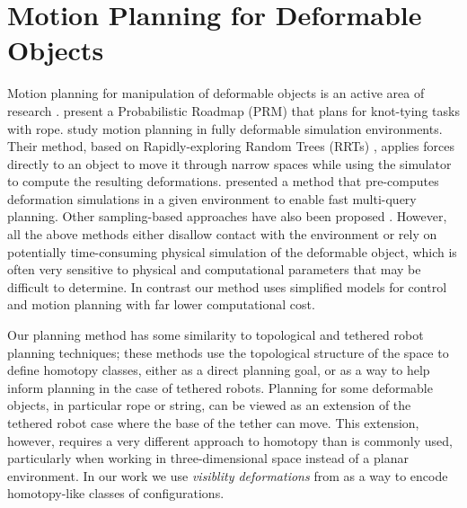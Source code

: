 
\section{Motion Planning for Deformable Objects}

Motion planning for manipulation of deformable objects is an active area of research \cite{Jimenez2012}. \citet{Saha2008} present a Probabilistic Roadmap (PRM) \cite{Kavraki1996} that plans for knot-tying tasks with rope. \citet{Rodriguez2006} study motion planning in fully deformable simulation environments. Their method, based on Rapidly-exploring Random Trees (RRTs) \cite{LaValle2006}, applies forces directly to an object to move it through narrow spaces while using the simulator to compute the resulting deformations. \citet{Frank2011} presented a method that pre-computes deformation simulations in a given environment to enable fast multi-query planning. Other sampling-based approaches have also been proposed \cite{Anshelevich2000a, Lamiraux2001, BurchanBayazit2002, Gayle2005, Moll2006, Roussel2015}. However, all the above methods either disallow contact with the environment or rely on potentially time-consuming physical simulation of the deformable object, which is often very sensitive to physical and computational parameters that may be difficult to determine. In contrast our method uses simplified models for control and motion planning with far lower computational cost.

Our planning method has some similarity to topological \cite{Jaillet2008, Bhattacharya2012} and tethered robot \cite{Brass2015, SoonkyumKim2015} planning techniques; these methods use the topological structure of the space to define homotopy classes, either as a direct planning goal, or as a way to help inform planning in the case of tethered robots. Planning for some deformable objects, in particular rope or string, can be viewed as an extension of the tethered robot case where the base of the tether can move. This extension, however, requires a very different approach to homotopy than is commonly used, particularly when working in three-dimensional space instead of a planar environment. In our work we use \textit{visiblity deformations} from \cite{Jaillet2008} as a way to encode homotopy-like classes of configurations.

